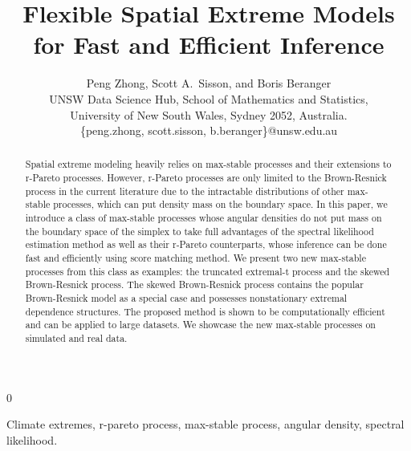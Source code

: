 \documentclass[12pt]{article}
\newcommand{\blind}{0}
\begin{document}
\def\spacingset#1{\renewcommand{\baselinestretch}%
{#1}\small\normalsize} \spacingset{1.5}


\title{\bf Flexible Spatial Extreme Models for Fast and Efficient Inference}
\blind{
  \author{Peng Zhong, Scott A.~Sisson, and Boris Beranger \\ 
  UNSW Data Science Hub, School of Mathematics and Statistics,\\ University of New South Wales, Sydney 2052, Australia. \\
  \{peng.zhong, scott.sisson, b.beranger\}@unsw.edu.au}
  \maketitle
}\fi

\baselineskip=25pt
\begin{abstract}
    Spatial extreme modeling heavily relies on max-stable processes and their extensions to r-Pareto processes. However, r-Pareto processes are only limited to the Brown-Resnick process in the current literature due to the intractable distributions of other max-stable processes, which can put density mass on the boundary space. In this paper, we introduce a class of max-stable processes whose angular densities do not put mass on the boundary space of the simplex to take full advantages of the spectral likelihood estimation method as well as their r-Pareto counterparts, whose inference can be done fast and efficiently using score matching method. We present two new max-stable processes from this class as examples: the truncated extremal-t process and the skewed Brown-Resnick process. The skewed Brown-Resnick process contains the popular Brown-Resnick model as a special case and possesses nonstationary extremal dependence structures. The proposed method is shown to be computationally efficient and can be applied to large datasets. We showcase the new max-stable processes on simulated and real data. 
\end{abstract}

  Climate extremes, r-pareto process, max-stable process, angular density, spectral likelihood.
\vfill

\baselineskip=25pt
\end{document}
